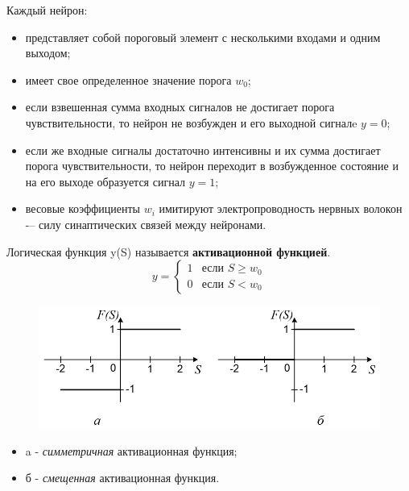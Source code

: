 \documentclass{beamer}
\begin{document}
\begin{frame}
	\linespread{1.0}
	Каждый нейрон:
	\begin{itemize}
		\item представляет собой пороговый элемент с несколькими входами и одним выходом;
		\item имеет свое определенное значение порога $w_0$;
		\item если взвешенная сумма входных сигналов не достигает порога чувствительности, то нейрон не возбужден и его выходной сигналe $y=0$;
		\item если же входные сигналы достаточно интенсивны и их сумма достигает порога чувствительности, то нейрон переходит в возбужденное состояние и на его выходе образуется сигнал $y=1$;
		\item весовые коэффициенты $w_i$ имитируют электропроводность нервных волокон -– силу синаптических связей между нейронами. 		
	\end{itemize}
	\linespread{0.8}	
\end{frame}

\begin{frame}
	\linespread{1.0}
	Логическая функция y(S) называется \textbf{активационной функцией}.
	\[ y =
		\begin{cases}
		1 & \text{если } S\geq w_0 \\
		0 & \text{если } S< w_0
		\end{cases}
	\]	
	\begin{figure}[h]
		\centering
		\includegraphics[scale=0.5]{images/lec03-activation.png}
	\end{figure}
	\begin{itemize}
		\item a - \textit{симметричная} активационная функция;
		\item б - \textit{смещенная} активационная функция.
	\end{itemize}
	\linespread{0.8}	
\end{frame}
\end{document}
